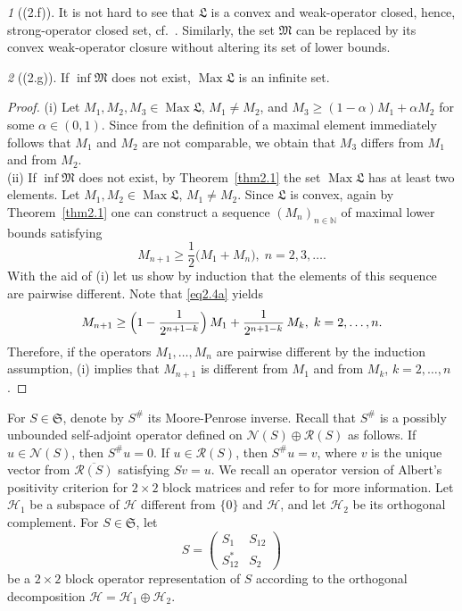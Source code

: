 \documentclass[12pt, a4paper, reqno, twoside]{amsart}
\numberwithin{equation}{section}
\DeclareMathOperator{\Max}{Max}
\newcommand{\frakS}{\mathfrak S}
\newcommand{\frakL}{\mathfrak L}
\newcommand{\frakM}{\mathfrak M}
\theoremstyle{definition}
\theoremstyle{remark}
\theoremstyle{mystyle}
\newtheorem*{fact*}{}
\begin{document}
\begin{fact*}[(2.f)]
\label{fa2.f}
It is not hard to see that $\frakL$ is a convex and
weak-operator closed, hence, strong-operator closed set, cf.\
\cite[Thm.~5.1.2]{KadisonRingrose1983}. Similarly, the set $\frakM$
can be replaced by its convex weak-operator closure without altering
its set of lower bounds.
\end{fact*}

\begin{fact*}[(2.g)]
\label{fa2.g}  
If $\inf\frakM$ does not exist, $\Max\frakL$ is an infinite set. 
\end{fact*}

\begin{proof}
(i) Let $M_{1},M_{2},M_{3}\in\Max\frakL$, $M_{1}\neq M_{2}$, and
$M_{3}\geq(1-\alpha)M_{1}+\alpha M_{2}$ for some $\alpha\in(0,1)$.
Since from the definition of a maximal element immediately follows
that $M_{1}$ and $M_{2}$ are not comparable, we obtain that $M_{3}$
differs from $M_{1}$ and from $M_{2}$. \\
(ii) If $\inf\frakM$ does not exist, by Theorem~\ref{thm2.1} the set
$\Max\frakL$ has at least two elements. Let
$M_{1},M_{2}\in\Max\frakL$, $M_{1}\neq M_{2}$. Since $\frakL$ is
convex, again by Theorem~\ref{thm2.1} one can construct a sequence
$(M_{n})_{n\in\mathbb N}$ of maximal lower bounds satisfying
\begin{equation}
\label{eq2.4a}
M_{n+1}\geq \frac{1}{2}\bigl(M_{1}+M_{n}\bigr),\;n = 2,3,\ldots.
\end{equation}
With the aid of (i) let us show by induction that the elements of this
sequence are pairwise different. Note that \eqref{eq2.4a} yields
\[
M_{n+1} \geq
 \Bigl(1-\frac{1}{2^{n+1-k}}\Bigr)\, M_{1}
  + \frac{1}{2^{n+1-k}}\,M_{k},\; k = 2,\ldots,n.
\]
Therefore, if the operators $M_{1},\ldots,M_{n}$ are pairwise
different by the induction assumption, (i) implies that $M_{n+1}$ is
different from $M_{1}$ and from $M_{k}$, $k=2,\ldots,n$.
\end{proof}

For $S\in\frakS$, denote by $S^{\#}$ its Moore-Penrose inverse. Recall
that $S^{\#}$ is a possibly unbounded self-adjoint operator defined on
$\mathscr N(S)\oplus\mathscr R(S)$ as follows. If $u\in\mathscr N(S)$,
then $S^{\#}u=0$. If $u\in\mathscr R(S)$, then $S^{\#}u=v$, where $v$
is the unique vector from $\overline{\mathscr R(S)}$ satisfying
$Sv=u$. We recall an operator version of Albert's positivity criterion
for $2\times 2$ block matrices and refer to \cite{Shmulyan1959} for
more information. Let $\mathscr H_{1}$ be a subspace of $\mathscr H$
different from $\{0\}$ and $\mathscr H$, and let $\mathscr H_{2}$ be
its orthogonal complement. For $S\in\frakS$, let
\begin{equation}
  \label{eq2.5}
  S = \begin{pmatrix} S_{1} & S_{12} \\ S_{12}^{\ast} & S_{2}
      \end{pmatrix}
\end{equation}
be a $2\times 2$ block operator representation of $S$ according to the
orthogonal decomposition $\mathscr H = \mathscr H_{1}\oplus\mathscr H_{2}$.
\end{document}
